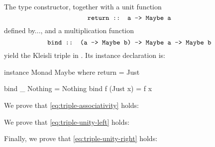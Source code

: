 \begin{example}
  \label{ex:triple-maybe-haskell}

  The  type constructor, together with a unit
  function
  \begin{equation*}
    \text{\texttt{return :: a -> Maybe a}}
  \end{equation*}
  defined by..., and a multiplication function
  \begin{equation*}
    \text{\texttt{bind :: (a -> Maybe b) -> Maybe a -> Maybe b}}
  \end{equation*}
  yield the  Kleisli triple in \hask. Its instance
  declaration is:

  \begin{codehaskell}
instance Monad Maybe where
  return = Just

  bind _ Nothing  = Nothing
  bind f (Just x) = f x
  \end{codehaskell}

  We prove that \eqref{eq:triple-associativity} holds:

  \vspace{1em}
  \begin{steps}
  \end{steps}
  \begin{steps}
  \end{steps}
  We prove that \eqref{eq:triple-unity-left} holds:
  \begin{steps}
  \end{steps}
  Finally, we prove that \eqref{eq:triple-unity-right} holds:

  \vspace{1em}
  \begin{steps}
  \end{steps}
  \begin{steps}
  \end{steps}

\end{example}

